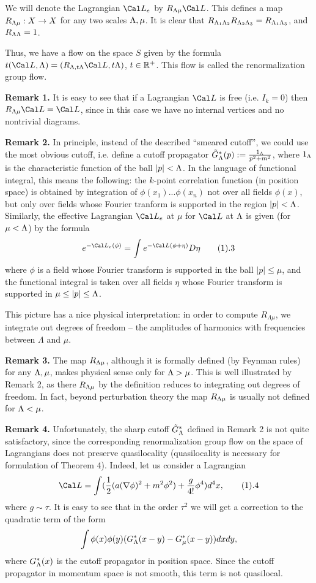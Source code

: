 We will denote the Lagrangian $\Cal L_e$ by $R_{\L\mu}\Cal L$.
This defines a map $R_{\Lambda\mu}: X\to X$ for any two scales 
$\Lambda,\mu$. It is clear that $R_{\Lambda_1\Lambda_2}R_{\Lambda_2\Lambda_3}=R_{\Lambda_1\Lambda_3}$,
and $R_{\Lambda\Lambda}=1$.

Thus, we have a flow on the space
$S$ given by the formula
$t(\Cal L,\L)=(R_{\L,t\L}\Cal L,t\L)$, 
$t\in \Bbb R^+$. This flow is called the renormalization group flow. 

{\bf Remark 1.} It is easy to see that if a Lagrangian $\Cal L$ 
is free (i.e. $I_k=0$) then $R_{\L\mu}\Cal L=\Cal L$, since in this case
we have no internal vertices and no nontrivial diagrams. 

{\bf Remark 2.} In principle, instead of the described ``smeared cutoff'', 
we could use the
most obvious cutoff,
i.e. define a cutoff propagator $\tilde G^*_\Lambda(p):=\frac{1_\Lambda}{p^2+m^2}$,
where $1_\Lambda$ is
the characteristic function of the ball $|p|<\Lambda$.
In the language of functional integral, this means the following:
the $k$-point correlation function (in position space) 
is obtained by integration of $\phi(x_1)...\phi(x_n)$ 
not over all fields $\phi(x)$, but only 
over fields whose Fourier tranform is supported in the region $|p|<\Lambda$. 
Similarly, the effective Lagrangian $\Cal L_e$ 
at $\mu$ for $\Cal L$ at $\Lambda$ is given (for $\mu<\Lambda$) by the formula
$$
e^{-\Cal L_e(\phi)}=\int e^{-\Cal L(\phi+\eta)}D\eta \tag 1.3
$$
where $\phi$ is a field whose Fourier transform is supported in the ball 
$|p|\le \mu$, and the functional integral is taken over all 
fields $\eta$ whose Fourier transform is supported in $\mu\le |p|\le \Lambda$.

This picture has a nice physical interpretation: 
in order to compute $R_{\Lambda\mu}$, 
we integrate out degrees of freedom -- the amplitudes of harmonics with
frequencies between $\Lambda$ and $\mu$. 

{\bf Remark 3.} 
The map $R_{\Lambda\mu}$, although 
it is formally defined (by Feynman rules) for any $\Lambda,\mu$, makes physical
sense only for $\Lambda>\mu$. This is well illustrated by
Remark 2, as there $R_{\Lambda\mu}$ by the definition reduces to 
integrating out degrees of freedom.
In fact, beyond perturbation theory the map
$R_{\Lambda\mu}$ is usually not defined for $\Lambda<\mu$. 

{\bf Remark 4.} Unfortunately, the sharp cutoff $\tilde G^*_\Lambda$
defined in Remark 2 is not quite satisfactory, since 
the corresponding renormalization group flow on the space
of Lagrangians does not preserve quasilocality
(quasilocality is necessary for formulation of Theorem 4). 
Indeed, let us consider 
a Lagrangian
$$
\Cal L=\int
(\frac{1}{2}(a(\nabla\phi)^2+m^2\phi^2)+\frac{g}{4!}\phi^4)d^4x,
\tag 1.4
$$
where $g\sim \tau$. 
It is easy to see that in the order $\tau^2$ we will get a correction
to the quadratic term of the form
$$
\int \phi(x)\phi(y)(G^*_{\Lambda}(x-y)-G^*_{\mu}(x-y))dxdy,
$$
where $G^*_{\Lambda}(x)$ is the cutoff propagator in position space. 
Since the cutoff propagator in momentum space is not smooth, 
this term is not quasilocal. 

